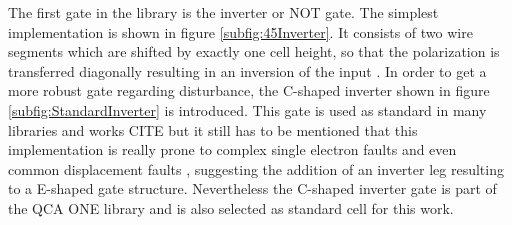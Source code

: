 The first gate in the library is the inverter or NOT gate. The simplest implementation is shown in figure \ref{subfig:45Inverter}. It consists of two wire segments which are shifted by exactly one cell height, so that the polarization is transferred diagonally resulting in an inversion of the input \cite{Sasamal2020QuantumDotCA}. In order to get a more robust gate regarding disturbance, the C-shaped inverter shown in figure \ref{subfig:StandardInverter} is introduced. This gate is used as standard in many libraries and works CITE but it still has to be mentioned that this implementation is really prone to complex single electron faults \cite{SingelElectronFaults} and even common displacement faults \cite{Inverter_displacements}, suggesting the addition of an inverter leg resulting to a E-shaped gate structure. Nevertheless the C-shaped inverter gate is part of the QCA ONE library and is also selected as standard cell for this work.\\
